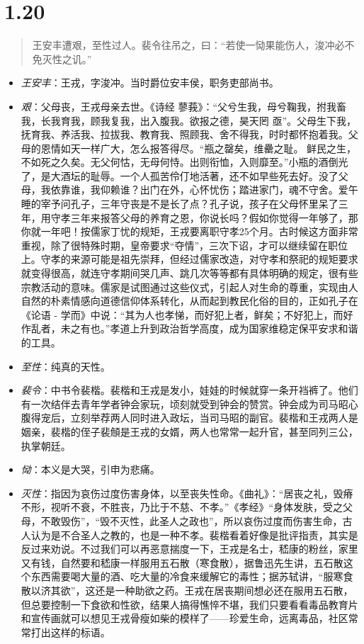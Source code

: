 \documentclass[]{book}
\providecommand{\tightlist}{%
  \setlength{\itemsep}{0pt}\setlength{\parskip}{0pt}}
\begin{document}
\section{1.20}\label{section-19}

\begin{quote}
王安丰遭艰，至性过人。裴令往吊之，曰：``若使一恸果能伤人，浚冲必不免灭性之讥。''
\end{quote}

\begin{itemize}
\tightlist
\item
  \emph{王安丰}：王戎，字浚冲。当时爵位安丰侯，职务吏部尚书。
\item
  \emph{艰}：父母丧，王戎母亲去世。《诗经
  蓼莪》：``父兮生我，母兮鞠我，拊我畜我，长我育我，顾我复我，出入腹我。欲报之德，昊天罔
  亟''。父母生下我，抚育我、养活我、拉拔我、教育我、照顾我、舍不得我，时时都怀抱着我。父母的恩情如天一样广大，怎么报答得尽。``瓶之罄矣，维罍之耻。
  鲜民之生，不如死之久矣。无父何怙，无母何恃。出则衔恤，入则靡至。''小瓶的酒倒光了，是大酒坛的耻辱。一个人孤苦伶仃地活著，还不如早些死去好。没了父母，我依靠谁，我仰赖谁？出门在外，心怀忧伤；踏进家门，魂不守舍。爱午睡的宰予问孔子，三年守丧是不是长了点？孔子说，孩子在父母怀里呆了三年，用守孝三年来报答父母的养育之恩，你说长吗？假如你觉得一年够了，那你就一年吧！按儒家丁忧的规矩，王戎要离职守孝25个月。古时候这方面非常重视，除了很特殊时期，皇帝要求``夺情''，三次下诏，才可以继续留在职位上。守孝的来源可能是祖先崇拜，但经过儒家改造，对守孝和祭祀的规矩要求就变得很高，就连守孝期间哭几声、跳几次等等都有具体明确的规定，很有些宗教活动的意味。儒家是试图通过这些仪式，引起人对生命的尊重，实现由人自然的朴素情感向道德信仰体系转化，从而起到教民化俗的目的，正如孔子在《论语
  -
  学而》中说：``其为人也孝悌，而好犯上者，鲜矣；不好犯上，而好作乱者，未之有也。''孝道上升到政治哲学高度，成为国家维稳定保平安求和谐的工具。
\item
  \emph{至性}：纯真的天性。
\item
  \emph{裴令}：中书令裴楷。裴楷和王戎是发小，娃娃的时候就穿一条开裆裤了。他们有一次结伴去青年学者钟会家玩，顷刻就受到钟会的赞赏。钟会成为司马昭心腹得宠后，立刻举荐两人同时进入政坛，当司马昭的副官。裴楷和王戎两人是姻亲，裴楷的侄子裴頠是王戎的女婿，两人也常常一起升官，甚至同列三公，执掌朝廷。
\item
  \emph{恸}：本义是大哭，引申为悲痛。
\item
  \emph{灭性}：指因为哀伤过度伤害身体，以至丧失性命。《曲礼》：``居丧之礼，毁瘠不形，视听不衰，不胜丧，乃比于不慈、不孝。''《孝经》``身体发肤，受之父母，不敢毁伤''，``毁不灭性，此圣人之政也''，所以哀伤过度而伤害生命，古人认为是不合圣人之教的，也是一种不孝。裴楷看着好像是批评指责，其实是反过来劝说。不过我们可以再恶意揣度一下，王戎是名士，嵇康的粉丝，家里又有钱，自然要和嵇康一样服用五石散（寒食散），据鲁迅先生讲，五石散这个东西需要喝大量的酒、吃大量的冷食来缓解它的毒性；据苏轼讲，``服寒食散以济其欲''，这还是一种助欲之药。王戎在居丧期间想必还在服用五石散，但总要控制一下食欲和性欲，结果人搞得憔悴不堪，我们只要看看毒品教育片和宣传画就可以想见王戎骨瘦如柴的模样了------珍爱生命，远离毒品，社区常常打出这样的标语。
\end{itemize}
\end{document}
